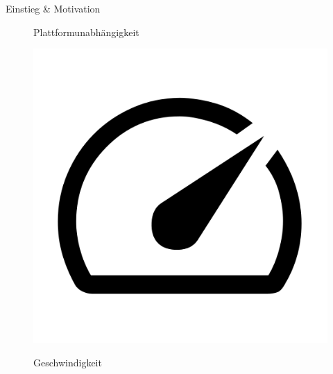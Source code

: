 \begin{frame}{Einstieg \& Motivation}
\begin{figure}[h]
\begin{minipage}{.32\textwidth}
\begin{center}
				{\small Plattformunabhängigkeit}
			\end{center}
		\end{minipage}
		\pause
		\hfill
		\begin{minipage}{.32\textwidth}
			\begin{center}
				\centerline{\includegraphics[width=.5\textwidth]{assets/google_icon_speed.png}}
				{\small Geschwindigkeit}
			\end{center}
		\end{minipage}
	\end{figure}
\end{frame}

